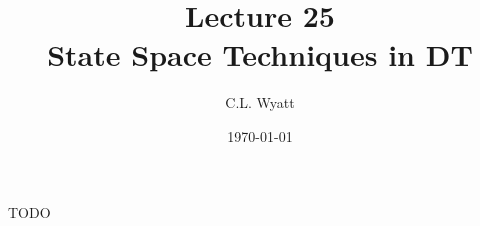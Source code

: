 \documentclass{article}
\begin{document}
\title{Lecture 25\\State Space Techniques in DT}
\author{C.L. Wyatt}
\date{\today}
\maketitle

TODO
\end{document}
